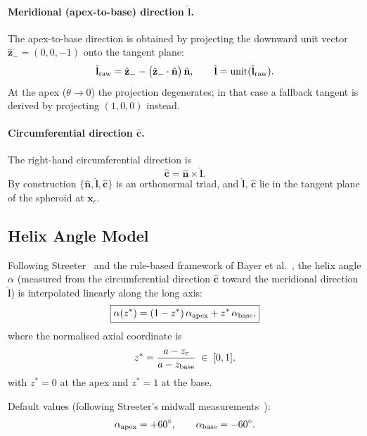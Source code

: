 \documentclass[11pt,a4paper]{article}
\newcommand{\bn}{\hat{\mathbf{n}}}
\newcommand{\bl}{\hat{\mathbf{l}}}
\newcommand{\bc}{\hat{\mathbf{c}}}
\newcommand{\bx}{\mathbf{x}}
\begin{document}
\paragraph{Meridional (apex-to-base) direction $\bl$.}
The apex-to-base direction is obtained by projecting the downward unit vector
$\hat{\mathbf{z}}_{-} = (0,0,-1)$ onto the tangent plane:
\begin{equation}
  \bl_{\rm raw} = \hat{\mathbf{z}}_{-}
                  - \bigl(\hat{\mathbf{z}}_{-}\cdot\bn\bigr)\,\bn,
  \qquad
  \bl = \mathrm{unit}(\bl_{\rm raw}).
  \label{eq:meridional}
\end{equation}
At the apex ($\theta\to 0$) the projection degenerates; in that case a
fallback tangent is derived by projecting $(1,0,0)$ instead.

\paragraph{Circumferential direction $\bc$.}
The right-hand circumferential direction is
\begin{equation}
  \bc = \bn \times \bl.
  \label{eq:circumferential}
\end{equation}
By construction $\{\bn,\bl,\bc\}$ is an orthonormal triad, and $\bl$, $\bc$
lie in the tangent plane of the spheroid at $\bx_c$.

\subsection{Helix Angle Model}

Following Streeter~\cite{Streeter1969} and the rule-based framework of
Bayer et al.~\cite{Bayer2012}, the helix angle $\alpha$ (measured from the
circumferential direction $\bc$ toward the meridional direction $\bl$) is
interpolated linearly along the long axis:
\begin{equation}
  \boxed{
    \alpha(z^*) = (1 - z^*)\,\alpha_{\rm apex} + z^*\,\alpha_{\rm base},
  }
  \label{eq:helix_angle}
\end{equation}
where the normalised axial coordinate is
\begin{equation}
  z^* = \frac{a - z_c}{a - z_{\rm base}} \;\in\; [0,1],
  \label{eq:zstar}
\end{equation}
with $z^* = 0$ at the apex and $z^* = 1$ at the base.

Default values (following Streeter's midwall measurements~\cite{Streeter1969}):
\[
  \alpha_{\rm apex} = +60^\circ, \qquad \alpha_{\rm base} = -60^\circ.
\]
\end{document}
